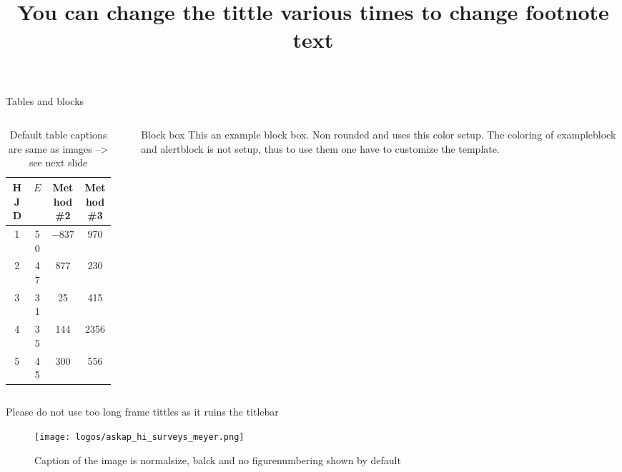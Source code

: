 \documentclass[9pt,t]{beamer} %
\begin{document}
\begin{frame}{Tables and blocks}
  \begin{columns}
    \begin{column}{0.4\textwidth}
      \begin{table}
      \centering                                      %
      \caption{\centering Default table captions are same as images --> see next slide}              %
        \begin{tabular}{c c c c}          %
        \toprule                        %
        HJD & $E$ & Method\#2 & Method\#3 \\    %
        \midrule                                   %
            1 & 50 & $-837$ & 970 \\      %
            2 & 47 & 877      & 230 \\
            3 & 31 & 25        & 415 \\
            4 & 35 & 144      & 2356 \\
            5 & 45 & 300      & 556 \\
        \bottomrule                                             %
        \end{tabular}
      \end{table}
    \end{column}
    \begin{column}{0.1\textwidth}
    \end{column}
    \begin{column}{0.4\textwidth}
      \centering
      \begin{block}{Block box}
        This an example block box. Non rounded and uses this color setup. The coloring of exampleblock and alertblock is not setup, thus to use them one have to customize the template. 
      \end{block}
    \end{column}
  \end{columns}
\end{frame}
\title{You can change the tittle various times to change footnote text} %
\begin{frame}{Please do not use too long frame tittles as it ruins the titlebar} %
  \begin{figure}[H]
    \centering
    \centerline{
    \texttt{[image: logos/askap\_hi\_surveys\_meyer.png]}
    }
    \caption{Caption of the image is normalsize, balck and no figurenumbering shown by default}
  \end{figure}
\end{frame}
\end{document}
